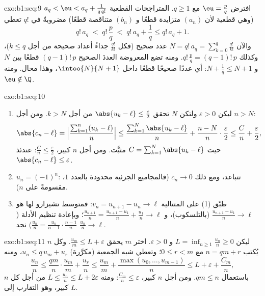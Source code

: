 \begin{solution}{exo:b1:seq:9}
افترض $\eu = \frac pq$ مع $q \geq 1$. المتراجحات القطعية $a_q <
\eu < a_q + \frac{1}{q\,q!}$ (وهي قطعية لأن $(a_n)$ متزايدة
قطعًا و $(b_n)$ متناقصة قطعًا) مضروبةً في $q!$ تعطي
\[
q!\,a_q \;<\; q!\,\frac pq \;<\; q!\,a_q + \frac 1q \leq q!\,a_q + 1.
\]
والآن $N = q!\,a_q = \sum_{k=0}^{q} \frac{q!}{k!}$ عدد صحيح (فكل
$\frac{q!}{k!}$ جداءُ أعداد صحيحة من أجل $k \leq q$)، وكذلك
$q!\,\frac pq = (q-1)!\,p$. ومنه تضع المعروضة العددَ الصحيح
$(q-1)!\,p$ قطعًا بين $N$ و $N + \frac 1q \leq N + 1$: أي عددًا
صحيحًا قطعًا داخل $\intoo{N}{N+1}$، وهذا محال. ومنه
$\eu \notin \Q$.
\end{solution}

\begin{solution}{exo:b1:seq:10}
\begin{enumerate}
  \item ليكن $\varepsilon > 0$ ولتكن $N$ تحقق $\abs{u_k - \ell} \leq
        \frac{\varepsilon}{2}$ من أجل $k > N$. ومن أجل $n > N$:
        \[
        \abs{c_n - \ell}
        = \Bigl|\frac{\sum_{k=1}^{n}(u_k - \ell)}{n}\Bigr|
        \leq \frac{\sum_{k=1}^{N} \abs{u_k - \ell}}{n}
        + \frac{n - N}{n}\cdot\frac{\varepsilon}{2}
        \leq \frac{C}{n} + \frac{\varepsilon}{2},
        \]
        حيث $C = \sum_{k=1}^N \abs{u_k - \ell}$ مثبَّت. ومن أجل $n$
        كبير، $\frac Cn \leq \frac\varepsilon2$: عندئذ $\abs{c_n -
        \ell} \leq \varepsilon$.
  \item $u_n = (-1)^n$: تتباعد، ومع ذلك $c_n \to 0$ (فالمجاميع الجزئية
        محدودة بالعدد $1$، مقسومةً على $n$).
  \item طبّق (1) على المتتالية $v_n = u_{n+1} - u_n \to \ell$: فمتوسط
        تشيزارو لها هو $\frac{u_{n+1} - u_1}{n} \to \ell$
        (بالتلسكوب)، و $\frac{u_{n+1}}{n} = \frac{u_{n+1} -
        u_1}{n} + \frac{u_1}{n} \to \ell$؛ وبإعادة تنظيم الأدلة
        ($\frac{u_n}{n} = \frac{u_n}{n-1}\cdot\frac{n-1}{n}$) نجد
        $\frac{u_n}{n} \to \ell$.
\end{enumerate}
\end{solution}

\begin{solution}{exo:b1:seq:11}
ليكن $L = \inf_{n \geq 1} \frac{u_n}{n} \geq 0$ و $\varepsilon >
0$. اختر $m$ يحقق $\frac{u_m}{m} \leq L + \varepsilon$. وكل $n$
يُكتب $n = qm + r$ مع $0 \leq r < m$؛ وتعطي شبه الجمعية (مكرَّرة)
$u_n \leq q\,u_m + u_r$، ومنه
\[
\frac{u_n}{n} \leq \frac{q m}{n}\cdot\frac{u_m}{m} + \frac{u_r}{n}
\leq \frac{u_m}{m} + \frac{\max(u_0, \dots, u_{m-1})}{n}
\leq L + \varepsilon + \frac{C_m}{n},
\]
باستعمال $qm \leq n$. ومن أجل $n$ كبير، $\frac{C_m}{n} \leq \varepsilon$:
ومنه $L \leq \frac{u_n}{n} \leq L + 2\varepsilon$ من أجل كل $n$ كبير،
وهو التقارب إلى $L$.
\end{solution}

